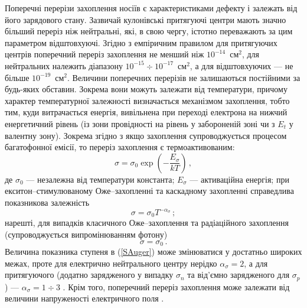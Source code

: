 Поперечні перерізи захоплення носіїв є характеристиками
дефекту і залежать від його зарядового стану.
Зазвичай кулонівські притягуючі центри мають значно більший переріз ніж нейтральні,
які, в свою чергу, істотно переважають за цим параметром відштовхуючі.
Згідно з емпіричним правилом для притягуючих центрів  поперечний переріз захоплення
не менший ніж $10^{-14}$~см$^2$,
для нейтральних належить діапазону $10^{-15}\div10^{-17}$~см$^2$,
а для відштовхуючих --- не більше $10^{-19}$~см$^2$.
Величини поперечних перерізів не залишаються постійними за будь-яких обставин.
Зокрема вони можуть залежати від температури, причому
характер температурної залежності визначається механізмом захоплення,
тобто тим, куди витрачається енергія, вивільнена при переході електрона на нижчий енергетичний рівень
(із зони провідності на рівень у забороненій зоні чи з $E_t$ у валентну зону).
Зокрема згідно з \cite{ROUGIEUX2018}
якщо захоплення супроводжується процесом багатофонної емісії, то
переріз захоплення є термоактивованим:
\begin{equation}
\label{Sta}
 \sigma=\sigma_0\exp\left(-\frac{E_{\sigma}}{kT}\right)\,,
\end{equation}
де
$\sigma_0$ --- незалежна від температури константа;
$E_{\sigma}$ --- активаційна енергія;
при екситон--стимулюваному Оже--захопленні та каскадному захопленні
справедлива показникова залежність
\begin{equation}
\label{SAuger}
 \sigma=\sigma_0 T^{-\alpha_{\sigma}}\,;
\end{equation}
нарешті, для випадків класичного Оже--захоплення та радіаційного
захоплення (супроводжується випромінюванням фотону)
\begin{equation}
\label{Sklas}
 \sigma=\sigma_0\,.
\end{equation}
Величина показника ступеня в (\ref{SAuger}) може змінюватися у достатньо широких
межах, проте для електрично нейтрального центру нерідко $\alpha_{\sigma}=2$,
а для притягуючого (додатно зарядженого у випадку $\sigma_n$
та від'ємно зарядженого для $\sigma_p$) --- $\alpha_{\sigma}=1\div3$ \cite{Sachenko2017}.
Крім того, поперечний переріз захоплення може залежати від величини напруженості електричного поля \cite{Shishiyanu,Bourgoin2001}.


